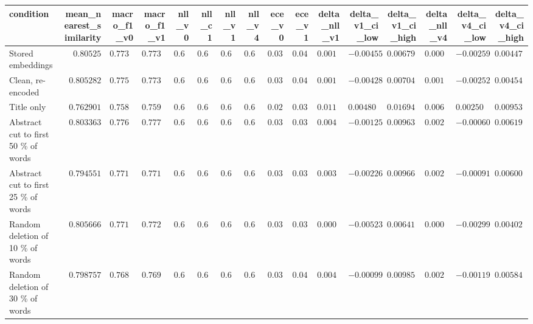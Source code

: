 \begin{tabular}{lrrrrrrrrrrrrrrr}
\toprule
condition & mean\_nearest\_similarity & macro\_f1\_v0 & macro\_f1\_v1 & nll\_v0 & nll\_c1 & nll\_v1 & nll\_v4 & ece\_v0 & ece\_v1 & delta\_nll\_v1 & delta\_v1\_ci\_low & delta\_v1\_ci\_high & delta\_nll\_v4 & delta\_v4\_ci\_low & delta\_v4\_ci\_high \\
\midrule
Stored embeddings & $0.80525$ & $0.773306$ & $0.773077$ & $0.65968$ & $0.660621$ & $0.658327$ & $0.658696$ & $0.0387823$ & $0.0459041$ & $0.00135259$ & $-0.00455836$ & $0.00679454$ & $0.000983667$ & $-0.00259742$ & $0.00447582$ \\
Clean, re-encoded & $0.805282$ & $0.775392$ & $0.773068$ & $0.65966$ & $0.660604$ & $0.658065$ & $0.658615$ & $0.0397297$ & $0.0427263$ & $0.00159594$ & $-0.00428907$ & $0.00704521$ & $0.00104524$ & $-0.00252162$ & $0.00454563$ \\
Title only & $0.762901$ & $0.758477$ & $0.75987$ & $0.684015$ & $0.684192$ & $0.67287$ & $0.677969$ & $0.0296193$ & $0.0365991$ & $0.0111452$ & $0.00480133$ & $0.0169454$ & $0.00604626$ & $0.00250811$ & $0.00953356$ \\
Abstract cut to first 50 \% of words & $0.803363$ & $0.776406$ & $0.777406$ & $0.658455$ & $0.659369$ & $0.654007$ & $0.655646$ & $0.0328408$ & $0.0359216$ & $0.00444836$ & $-0.00125068$ & $0.00963263$ & $0.00280869$ & $-0.000607186$ & $0.00619123$ \\
Abstract cut to first 25 \% of words & $0.794551$ & $0.771931$ & $0.771678$ & $0.662966$ & $0.663633$ & $0.658982$ & $0.660367$ & $0.0312744$ & $0.037326$ & $0.00398411$ & $-0.00226161$ & $0.00966598$ & $0.00259871$ & $-0.000915327$ & $0.00600836$ \\
Random deletion of 10 \% of words & $0.805666$ & $0.77146$ & $0.772463$ & $0.660221$ & $0.661146$ & $0.659319$ & $0.659668$ & $0.0388437$ & $0.039056$ & $0.000902453$ & $-0.00523704$ & $0.00641842$ & $0.000553122$ & $-0.00299952$ & $0.00402481$ \\
Random deletion of 30 \% of words & $0.798757$ & $0.768868$ & $0.76977$ & $0.670927$ & $0.671795$ & $0.666287$ & $0.668578$ & $0.0311797$ & $0.0422794$ & $0.00464058$ & $-0.000997677$ & $0.00985582$ & $0.00234923$ & $-0.00119558$ & $0.00584161$ \\
\bottomrule
\end{tabular}
